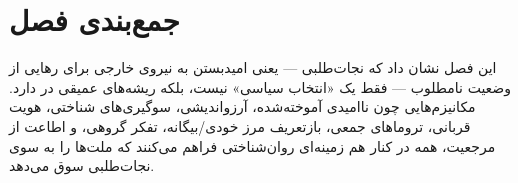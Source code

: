 \section{جمع‌بندی فصل}
\label{sec:ch11-conclusion}

این فصل نشان داد که نجات‌طلبی — یعنی امیدبستن به نیروی خارجی برای رهایی از وضعیت نامطلوب — فقط یک «انتخاب سیاسی» نیست، بلکه ریشه‌های عمیقی در  دارد. مکانیزم‌هایی چون ناامیدی آموخته‌شده، آرزواندیشی، سوگیری‌های شناختی، هویت قربانی، تروماهای جمعی، بازتعریف مرز خودی/بیگانه، تفکر گروهی، و اطاعت از مرجعیت، همه در کنار هم زمینه‌ای روان‌شناختی فراهم می‌کنند که ملت‌ها را به سوی نجات‌طلبی سوق می‌دهد.

